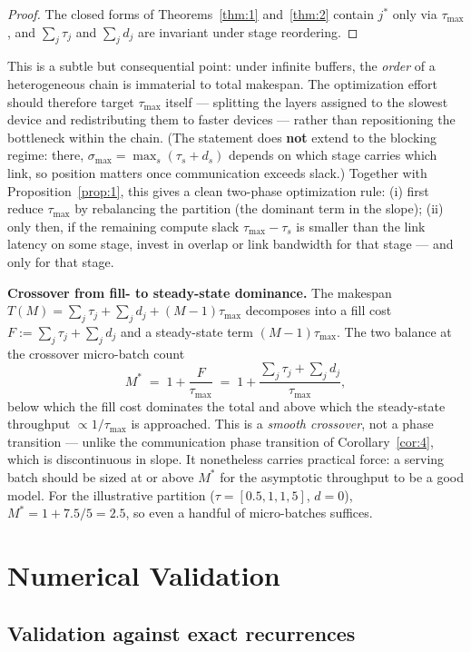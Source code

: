 \documentclass[11pt]{article}
\begin{document}
\begin{proof}
The closed forms of Theorems~\ref{thm:1} and~\ref{thm:2} contain $j^*$ only via $\tau_{\max}$, and $\sum_j\tau_j$ and $\sum_j d_j$ are invariant under stage reordering.
\end{proof}

This is a subtle but consequential point: under infinite buffers, the \emph{order} of a heterogeneous chain is immaterial to total makespan. The optimization effort should therefore target $\tau_{\max}$ itself --- splitting the layers assigned to the slowest device and redistributing them to faster devices --- rather than repositioning the bottleneck within the chain. (The statement does \textbf{not} extend to the blocking regime: there, $\sigma_{\max}=\max_s(\tau_s+d_s)$ depends on which stage carries which link, so position matters once communication exceeds slack.) Together with Proposition~\ref{prop:1}, this gives a clean two-phase optimization rule: (i) first reduce $\tau_{\max}$ by rebalancing the partition (the dominant term in the slope); (ii) only then, if the remaining compute slack $\tau_{\max}-\tau_s$ is smaller than the link latency on some stage, invest in overlap or link bandwidth for that stage --- and only for that stage.

\textbf{Crossover from fill- to steady-state dominance.} The makespan $T(M)=\sum_j\tau_j+\sum_j d_j+(M-1)\tau_{\max}$ decomposes into a fill cost $F:=\sum_j\tau_j+\sum_j d_j$ and a steady-state term $(M-1)\tau_{\max}$. The two balance at the crossover micro-batch count
\[
M^{*} \;=\; 1 + \frac{F}{\tau_{\max}} \;=\; 1 + \frac{\sum_j\tau_j+\sum_j d_j}{\tau_{\max}},
\]
below which the fill cost dominates the total and above which the steady-state throughput $\propto 1/\tau_{\max}$ is approached. This is a \emph{smooth crossover}, not a phase transition --- unlike the communication phase transition of Corollary~\ref{cor:4}, which is discontinuous in slope. It nonetheless carries practical force: a serving batch should be sized at or above $M^*$ for the asymptotic throughput to be a good model. For the illustrative partition ($\tau=[0.5,1,1,5]$, $d=0$), $M^{*}=1+7.5/5=2.5$, so even a handful of micro-batches suffices.

\section{Numerical Validation}\label{sec:validation}

\subsection{Validation against exact recurrences}\label{sec:val-rec}
\end{document}
